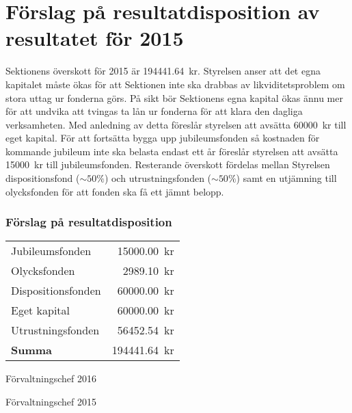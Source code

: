 \documentclass[../_main/handlingar.tex]{subfiles}
\begin{document}
\section{Förslag på resultatdisposition av resultatet för 2015}
Sektionens överskott för 2015 är \SI{194441.64}{kr}. Styrelsen anser att det egna kapitalet måste ökas för att Sektionen inte ska drabbas av likviditetsproblem om stora uttag ur fonderna görs. På sikt bör Sektionens egna kapital ökas ännu mer för att undvika att tvingas ta lån ur fonderna för att klara den dagliga verksamheten. Med anledning av detta föreslår styrelsen att avsätta \SI{60000}{kr} till eget kapital. För att fortsätta bygga upp jubileumsfonden så kostnaden för kommande jubileum inte ska belasta endast ett år föreslår styrelsen att avsätta \SI{15000}{kr} till jubileumsfonden. Resterande överskott fördelas mellan Styrelsen dispositionsfond ($\sim50\%$) och utrustningsfonden ($\sim50\%$) samt en utjämning till olycksfonden för att fonden ska få ett jämnt belopp.

\subsubsection{Förslag på resultatdisposition}
\begin{tabular}{l r}
    Jubileumsfonden & \SI{15000.00}{kr} \\
    Olycksfonden & \SI{2989.10}{kr} \\
    Dispositionsfonden & \SI{60000.00}{kr} \\
    Eget kapital & \SI{60000.00}{kr} \\
    Utrustningsfonden & \SI{56452.54}{kr} \\
    \hline
    \textbf{Summa} & \SI{194441.64}{kr} \\
\end{tabular}

\begin{signatures}{2}
    \ist
    \signature{Anders Nilsson}{Förvaltningschef 2016}
    \signature{Henrik Felding}{Förvaltningschef 2015}
\end{signatures}
\end{document}
